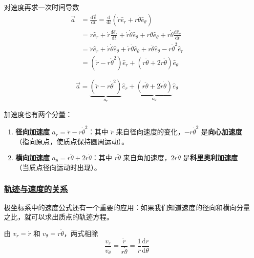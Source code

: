 对速度再求一次时间导数
\begin{align}
    \vec{a} &= \frac{\mathrm{d}\vec{v}}{\mathrm{d}t} = \frac{\mathrm{d}}{\mathrm{d}t}\left(\dot{r}\hat{e}_r + r\dot{\theta}\hat{e}_\theta\right) \nonumber \\
    &= \ddot{r}\hat{e}_r + \dot{r}\frac{\mathrm{d}\hat{e}_r}{\mathrm{d}t} + \dot{r}\dot{\theta}\hat{e}_\theta + r\ddot{\theta}\hat{e}_\theta + r\dot{\theta}\frac{\mathrm{d}\hat{e}_\theta}{\mathrm{d}t} \nonumber \\
    &= \ddot{r}\hat{e}_r + \dot{r}\dot{\theta}\hat{e}_\theta + \dot{r}\dot{\theta}\hat{e}_\theta + r\ddot{\theta}\hat{e}_\theta - r\dot{\theta}^2\hat{e}_r \nonumber \\
    &= (\ddot{r} - r\dot{\theta}^2)\hat{e}_r + (r\ddot{\theta} + 2\dot{r}\dot{\theta})\hat{e}_\theta
\end{align}

\begin{equation}
    \boxed{
        \vec{a} = \underbrace{(\ddot{r} - r\dot{\theta}^2)}_{a_r}\hat{e}_r + \underbrace{(r\ddot{\theta} + 2\dot{r}\dot{\theta})}_{a_\theta}\hat{e}_\theta
    }
\end{equation}

加速度也有两个分量：
\begin{enumerate}
    \item \textbf{径向加速度} $a_r = \ddot{r} - r\dot{\theta}^2$：其中 $\ddot{r}$ 来自径向速度的变化，$-r\dot{\theta}^2$ 是\textbf{向心加速度}（指向原点，使质点保持圆周运动）。
    \item \textbf{横向加速度} $a_\theta = r\ddot{\theta} + 2\dot{r}\dot{\theta}$：其中 $r\ddot{\theta}$ 来自角加速度，$2\dot{r}\dot{\theta}$ 是\textbf{科里奥利加速度}（当质点径向运动时出现）。
\end{enumerate}

\subsubsection{\protect\hyperlink{:}{轨迹与速度的关系}}

极坐标系中的速度公式还有一个重要的应用：如果我们知道速度的径向和横向分量之比，就可以求出质点的轨迹方程。

由 $v_r = \dot{r}$ 和 $v_\theta = r\dot{\theta}$，两式相除
\begin{equation}
    \frac{v_r}{v_\theta} = \frac{\dot{r}}{r\dot{\theta}} = \frac{1}{r}\frac{\mathrm{d}r}{\mathrm{d}\theta}
\end{equation}

